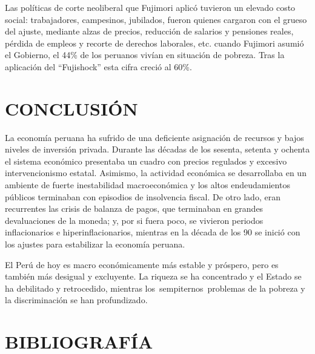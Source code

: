 \documentclass[
  letterpaper,
  DIV=11,
  numbers=noendperiod]{scrartcl}
\begin{document}
Las políticas de corte neoliberal que Fujimori aplicó tuvieron un
elevado costo social: trabajadores, campesinos, jubilados, fueron
quienes cargaron con el grueso del ajuste, mediante alzas de precios,
reducción de salarios y pensiones reales, pérdida de empleos y recorte
de derechos laborales, etc. cuando Fujimori asumió el Gobierno, el 44\%
de los peruanos vivían en situación de pobreza. Tras la aplicación del
``Fujishock'' esta cifra creció al 60\%.

\hypertarget{conclusiuxf3n}{%
\section{CONCLUSIÓN}\label{conclusiuxf3n}}

La economía peruana ha sufrido de una deficiente asignación de recursos
y bajos niveles de inversión privada. Durante las décadas de los
sesenta, setenta y ochenta el sistema económico presentaba un cuadro con
precios regulados y excesivo intervencionismo estatal. Asimismo, la
actividad económica se desarrollaba en un ambiente de fuerte
inestabilidad macroeconómica y los altos endeudamientos públicos
terminaban con episodios de insolvencia fiscal. De otro lado, eran
recurrentes las crisis de balanza de pagos, que terminaban en grandes
devaluaciones de la moneda; y, por si fuera poco, se vivieron periodos
inflacionarios e hiperinflacionarios, mientras en la década de los 90 se
inició con los ajustes para estabilizar la economía peruana.

El Perú de hoy es macro económicamente más estable y próspero, pero es
también más desigual y excluyente. La riqueza se ha concentrado y el
Estado se ha debilitado y retrocedido, mientras
los~sempiternos~problemas de la pobreza y la discriminación se han
profundizado.

\hypertarget{bibliografuxeda}{%
\section{BIBLIOGRAFÍA}\label{bibliografuxeda}}
\end{document}
